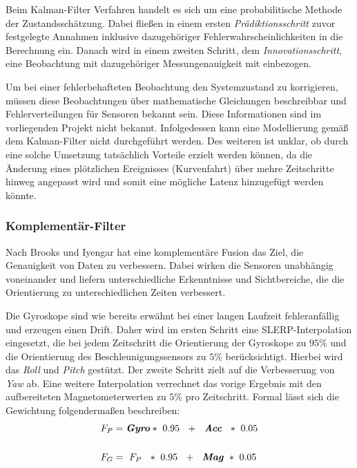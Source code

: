 Beim Kalman-Filter Verfahren \cite{kalman1960new} handelt es sich um eine probabilitische Methode der Zustandsschätzung.
Dabei fließen in einem ersten \emph{Prädiktionsschritt} zuvor festgelegte Annahmen inklusive dazugehöriger Fehlerwahrscheinlichkeiten in die Berechnung ein.
Danach wird in einem zweiten Schritt, dem \emph{Innovationsschritt}, eine Beobachtung mit dazugehöriger Messungenauigkeit mit einbezogen.

Um bei einer fehlerbehafteten Beobachtung den Systemzustand zu korrigieren, müssen diese Beobachtungen über mathematische Gleichungen beschreibbar und Fehlerverteilungen für Sensoren bekannt sein.
Diese Informationen sind im vorliegenden Projekt nicht bekannt.
Infolgedessen kann eine Modellierung gemäß dem Kalman-Filter nicht durchgeführt werden. 
Des weiteren ist unklar, ob durch eine solche Umsetzung tatsächlich Vorteile erzielt werden können, da die Änderung eines plötzlichen Ereignisses (Kurvenfahrt) über mehre Zeitschritte hinweg angepasst wird und somit eine mögliche Latenz hinzugefügt werden könnte.


\subsubsection{Komplementär-Filter}

Nach Brooks und Iyengar \cite{Brooks.1998} hat eine komplementäre Fusion das Ziel, die Genauigkeit von Daten zu verbessern. 
Dabei wirken die Sensoren unabhängig voneinander und liefern unterschiedliche Erkenntnisse und Sichtbereiche, die die Orientierung zu unterschiedlichen Zeiten verbessert.

Die Gyroskope sind wie bereits erwähnt bei einer langen Laufzeit fehleranfällig und erzeugen einen Drift. 
Daher wird im ersten Schritt eine \ac{SLERP}-Interpolation eingesetzt, die bei jedem Zeitschritt die Orientierung der Gyroskope zu $95\%$ und die Orientierung des Beschleunigungssensors zu $5\%$ berücksichtigt.
Hierbei wird das \emph{Roll} und \emph{Pitch} gestützt.
Der zweite Schritt zielt auf die Verbesserung von \emph{Yaw} ab.
Eine weitere Interpolation verrechnet das vorige Ergebnis mit den aufbereiteten Magnetometerwerten zu $5\%$ pro Zeitschritt.
Formal lässt sich die Gewichtung folgendermaßen beschreiben:
\begin{align}
F_P &= \textbf{\textit{Gyro}}*~0.95~~+~~\textbf{\textit{Acc}}~~*~0.05\\
\notag\\
F_G &= ~F_P~~*~0.95~~+~~\textbf{\textit{Mag}}~*~0.05
\end{align}

